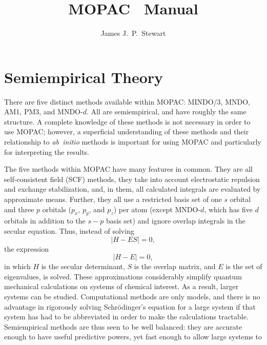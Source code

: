 \documentclass[a4paper]{book}
\title{MOPAC \mopacversion\ Manual}
\author{James J.\ P.\ Stewart}
\begin{document}
\section{Semiempirical Theory}\label{semit}
There are five distinct methods available within MOPAC: MINDO/3, MNDO, AM1,
PM3, and MNDO-$d$. All are semiempirical, and have roughly the same structure.
A complete knowledge of these methods is not necessary in order to use MOPAC;
however, a superficial understanding of these methods and their relationship to
{\em ab~initio} methods is important for using MOPAC and particularly for
interpreting the results.

The five methods within MOPAC have many features in common. They are all
self-consistent field (SCF) methods, they take into account electrostatic
repulsion and exchange stabilization, and, in them, all calculated integrals
are evaluated by approximate means. Further, they all use a restricted basis
set of one $s$ orbital and three $p$ orbitals ($p_x$, $p_y$, and $p_z$) per
atom (except MNDO-$d$, which has five $d$ orbitals in addition to the $s-p$
basis set) and ignore overlap  integrals in the secular equation. Thus, instead
of solving
$$
|H-ES| = 0,
$$
the expression
$$
|H-E| = 0,
$$
in which $H$ is the secular determinant, $S$ is the overlap matrix, and $E$ is
the set of eigenvalues, is solved. These approximations considerably simplify
quantum mechanical calculations on systems of chemical interest. As a result,
larger systems can be studied. Computational methods are only models, and there
is no advantage in rigorously solving Schr\"{o}dinger's equation for a large
system if that system has had to be abbreviated in order to make the
calculations tractable. Semiempirical methods are thus seen to be well
balanced: they are accurate enough to have useful predictive powers, yet fast
enough to allow large systems to be studied.

All five semiempirical methods contain sets of parameters. For MINDO/3 atomic
and diatomic parameters exist, while MNDO, AM1, PM3, and MNDO-$d$ use only
single-atom parameters. Not all parameters are optimized for all methods; for
example, in MINDO/3, MNDO and AM1 the two electron one center integrals are
normally taken from atomic spectra. In the list given in Table~\ref{pars},
parameters optimized for a given method are indicated by `$*$'. A `+' indicates
that the value of the parameter was obtained from experiment (not optimized).
Where neither symbol is given, the associated parameter is not used in that
method.
\end{document}
